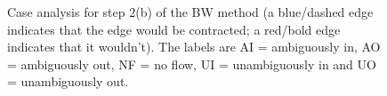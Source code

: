 \documentclass[preprint,a4paper]{elsarticle}
\newenvironment{stusubfig}[1]
{
	\begin{figure}[#1]
	\begin{center}
}
{
	\end{center}
	\end{figure}
}
\begin{document}
\begin{stusubfig}{p}
	\hspace{4mm}
\caption[Case analysis for step 2(b) of the BW method]{Case analysis for step 2(b) of the BW method (a blue/dashed edge indicates that the edge would be contracted; a red/bold edge indicates that it wouldn't). The labels are AI = ambiguously in, AO = ambiguously out, NF = no flow, UI = unambiguously in and UO = unambiguously out.}
\label{fig:segmentation-waterfall-smg-mergecases}
\end{stusubfig}
\end{document}
